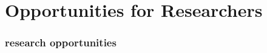 \section{Opportunities for Researchers}
\begin{comment}
Researchers: they exist! (10 seconds each, no more.)
* coleman - ethics in foss communities
* krafft - innovation diffusion
* benkler - "law stuff"
* von hippel - economics
* lawler - wikiversity formation
* dennys and martin - semantic mediawiki
* davis and jabeen - legitimate peripheral participation
* government adoption paper whose author name I forgot
* Mini Case Study: CC licensed video in Zach's research
\end{comment}

\begin{frame} 
\frametitle{research opportunities}
\end{frame} 
